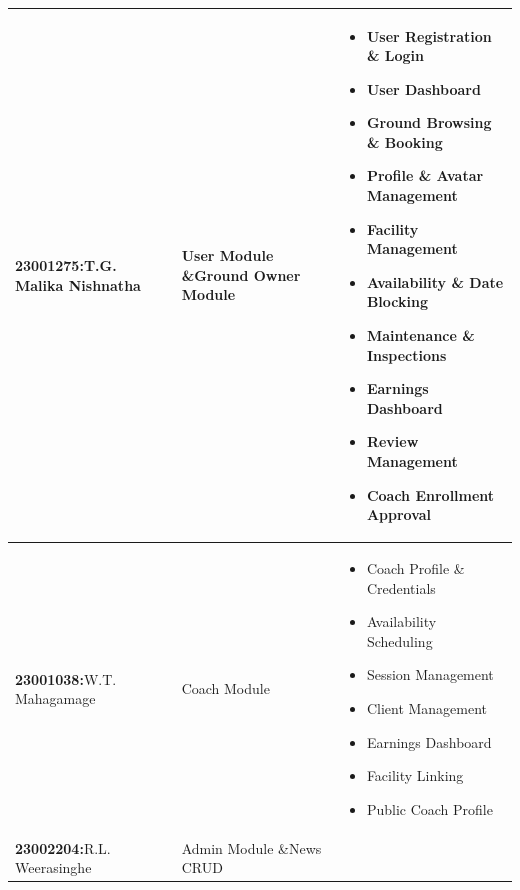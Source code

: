 \documentclass[12pt,a4paper]{article}
\begin{document}
\renewcommand{\arraystretch}{1.3}
\begin{center}
\begin{tabular}{|C{3.0cm}|C{3.0cm}|L{7.5cm}|}
\hline
\textbf{23001275:}\newline T.G. Malika Nishnatha
& User Module \&\newline Ground Owner Module
& \vspace{2pt}
  \begin{itemize}[leftmargin=1em, itemsep=1pt, topsep=2pt, parsep=0pt]
    \item User Registration \& Login
    \item User Dashboard
    \item Ground Browsing \& Booking
    \item Profile \& Avatar Management
    \item Facility Management
    \item Availability \& Date Blocking
    \item Maintenance \& Inspections
    \item Earnings Dashboard
    \item Review Management
    \item Coach Enrollment Approval
  \end{itemize}\vspace{2pt}
\\ \hline
\textbf{23001038:}\newline W.T. Mahagamage
& Coach Module
& \vspace{2pt}
  \begin{itemize}[leftmargin=1em, itemsep=1pt, topsep=2pt, parsep=0pt]
    \item Coach Profile \& Credentials
    \item Availability Scheduling
    \item Session Management
    \item Client Management
    \item Earnings Dashboard
    \item Facility Linking
    \item Public Coach Profile
  \end{itemize}\vspace{2pt}
\\ \hline
\textbf{23002204:}\newline R.L. Weerasinghe
& Admin Module \&\newline News CRUD
& \vspace{2pt}

\end{tabular}
\end{center}
\end{document}
